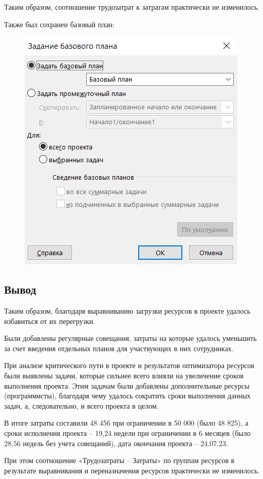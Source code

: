 Таким образом, соотношение трудозатрат к затратам практически не изменилось. 

Также был сохранен базовый план:

\begin{figure}[h!]
	\begin{center}
		\includegraphics[scale=0.38]{inc/img/p_21.png}
	\end{center}
	\captionsetup{justification=centering}
	\label{fig:u3}
\end{figure}

\newpage

\subsection*{Вывод}

Таким образом, благодаря выравниванию загрузки ресурсов в проекте удалось избавиться от их перегрузки.

Были добавлены регулярные совещания, затраты на которые удалось
уменьшить за счет введения отдельных планов для участвующих в них сотрудниках.

При анализе критического пути в проекте и результатов оптимизатора ресурсов были выявлены задачи, которые сильнее всего влияли на увеличение сроков выполнения проекта. Этим задачам были добавлены дополнительные ресурсы (программисты), благодаря чему удалось сократить сроки выполнения данных задач, а, следовательно, и всего проекта в целом.

В итоге затраты составили 48 456 при ограничении в 50 000 (было
48 825), а сроки исполнения проекта – 19,24 недели при
ограничении в 6 месяцев (было 28,56 недель без учета совещаний), дата окончания проекта – 24.07.23.

При этом соотношение «Трудозатраты – Затраты» по группам ресурсов в результате выравнивания и переназначения ресурсов практически не изменилось.